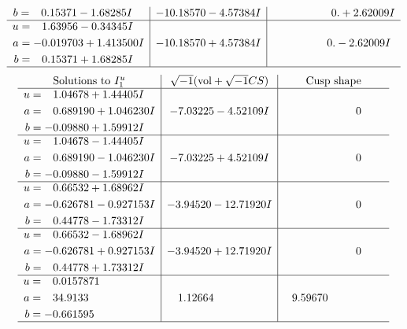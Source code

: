 \documentclass[1p]{elsarticle_modified}
\theoremstyle{definition}
\newcommand{\I}{\sqrt{-1}}
\begin{document}
$$\begin{array}{c|c|c}
\begin{aligned}
b &= \phantom{-}0.15371 - 1.68285 I\end{aligned}
 & -10.18570 - 4.57384 I & \phantom{-0.000000 -}0. + 2.62009 I \\ \hline\begin{aligned}
u &= \phantom{-}1.63956 - 0.34345 I \\
a &= -0.019703 + 1.413500 I \\
b &= \phantom{-}0.15371 + 1.68285 I\end{aligned}
 & -10.18570 + 4.57384 I & \phantom{-0.000000 } 0. - 2.62009 I\\
 \hline 
 \end{array}$$\newpage$$\begin{array}{c|c|c}  
\text{Solutions to }I^u_{1}& \I (\text{vol} + \sqrt{-1}CS) & \text{Cusp shape}\\
 \hline 
\begin{aligned}
u &= \phantom{-}1.04678 + 1.44405 I \\
a &= \phantom{-}0.689190 + 1.046230 I \\
b &= -0.09880 + 1.59912 I\end{aligned}
 & -7.03225 - 4.52109 I & \phantom{-0.000000 } 0 \\ \hline\begin{aligned}
u &= \phantom{-}1.04678 - 1.44405 I \\
a &= \phantom{-}0.689190 - 1.046230 I \\
b &= -0.09880 - 1.59912 I\end{aligned}
 & -7.03225 + 4.52109 I & \phantom{-0.000000 } 0 \\ \hline\begin{aligned}
u &= \phantom{-}0.66532 + 1.68962 I \\
a &= -0.626781 - 0.927153 I \\
b &= \phantom{-}0.44778 - 1.73312 I\end{aligned}
 & -3.94520 - 12.71920 I & \phantom{-0.000000 } 0 \\ \hline\begin{aligned}
u &= \phantom{-}0.66532 - 1.68962 I \\
a &= -0.626781 + 0.927153 I \\
b &= \phantom{-}0.44778 + 1.73312 I\end{aligned}
 & -3.94520 + 12.71920 I & \phantom{-0.000000 } 0 \\ \hline\begin{aligned}
u &= \phantom{-}0.0157871\phantom{ +0.000000I} \\
a &= \phantom{-}34.9133\phantom{ +0.000000I} \\
b &= -0.661595\phantom{ +0.000000I}\end{aligned}
 & \phantom{-}1.12664\phantom{ +0.000000I} & \phantom{-}9.59670\phantom{ +0.000000I}\\
 \hline 
 \end{array}$$\newpage\newpage\renewcommand{\arraystretch}{1}
\end{document}
